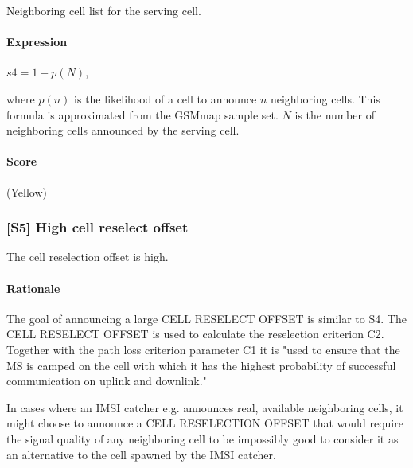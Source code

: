 \documentclass[a4paper,11pt,notitlepage,bigheadings,oneside]{scrartcl}
\begin{document}
Neighboring cell list for the serving cell.

\paragraph{Expression}

$s4 = 1 - p(N)$,

where $p(n)$ is the likelihood of a cell to announce $n$ neighboring cells.
This formula is approximated from the GSMmap sample set. $N$ is the number of
neighboring cells announced by the serving cell.

\paragraph{Score}

\TBD{} (Yellow)

\subsubsection{[S5] High cell reselect offset}

The cell reselection offset is high.

\paragraph{Rationale}

The goal of announcing a large CELL RESELECT OFFSET is similar to S4. The CELL
RESELECT OFFSET is used to calculate the reselection criterion C2. Together
with the path loss criterion parameter C1 it is "used to ensure that the MS is
camped on the cell with which it has the highest probability of successful
communication on uplink and downlink." \cite[6.4]{gsm0508}

In cases where an IMSI catcher e.g. announces real, available neighboring
cells, it might choose to announce a CELL RESELECTION OFFSET that would require
the signal quality of any neighboring cell to be impossibly good to consider it
as an alternative to the cell spawned by the IMSI catcher.

%
\end{document}
